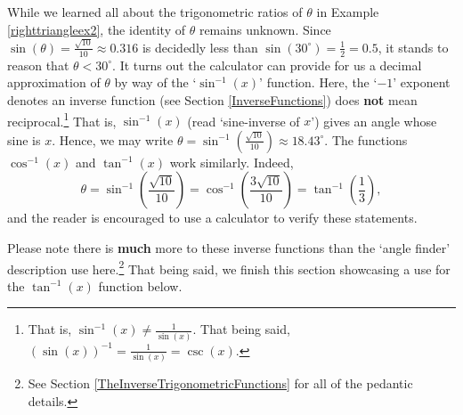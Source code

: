 While we learned all about the trigonometric ratios of $\theta$ in Example \ref{righttriangleex2}, the identity of $\theta$ remains unknown.  Since $\sin(\theta) = \frac{\sqrt{10}}{10} \approx 0.316 $ is decidedly less than $\sin\left(30^{\circ}\right) = \frac{1}{2} = 0.5$, it stands to reason that $\theta < 30^{\circ}$. It turns out the calculator can provide for us a decimal approximation of $\theta$ by way of the `$\sin^{-1}(x)$' function.  Here, the `$-1$' exponent denotes an inverse function (see Section \ref{InverseFunctions}) does \textbf{not} mean reciprocal.\footnote{That is, $\sin^{-1}(x) \neq \frac{1}{\sin(x)} $.  That being said, $(\sin(x))^{-1} = \frac{1}{\sin(x)} = \csc(x)$.}  That is, $\sin^{-1}(x)$ (read `sine-inverse of $x$') gives an angle whose sine is $x$.  Hence, we may write $\theta = \sin^{-1}\left(\frac{\sqrt{10}}{10}\right) \approx 18.43^{\circ}$.  The functions $\cos^{-1}(x)$ and $\tan^{-1}(x)$ work similarly.  Indeed, \[ \theta = \sin^{-1}\left(\frac{\sqrt{10}}{10}\right)  = \cos^{-1}\left(\frac{3 \sqrt{10}}{10}\right)  = \tan^{-1} \left( \frac{1}{3} \right),\] and the reader is encouraged to use a calculator to verify these statements.

\smallskip

Please note there is \textbf{much} more to these inverse functions than the `angle finder' description use here.\footnote{See Section \ref{TheInverseTrigonometricFunctions} for all of the pedantic details.}  That being said, we finish this section showcasing a use for the $\tan^{-1}(x)$ function below.

